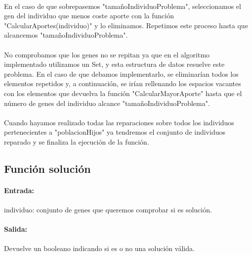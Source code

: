 	\paragraph{}En el caso de que sobrepasemos "tamañoIndividuoProblema", seleccionamos el gen del individuo que menos coste aporte con la función "CalcularAportes(individuo)" y lo eliminamos. Repetimos este proceso hasta que alcancemos "tamañoIndividuoProblema".
	
	\paragraph{}No comprobamos que los genes no se repitan ya que en el algoritmo implementado utilizamos un Set, y esta estructura de datos resuelve este problema. En el caso de que debamos implementarlo, se eliminarían todos los elementos repetidos y, a continuación, se irían rellenando los espacios vacantes con los elementos que devuelva la función "CalcularMayorAporte" hasta que el número de genes del individuo alcance "tamañoIndividuoProblema".
	
	\paragraph{}Cuando hayamos realizado todas las reparaciones sobre todos los individuos pertenecientes a "poblacionHijos" ya tendremos el conjunto de individuos reparado y se finaliza la ejecución de la función.
	
	\subsection{Función solución}
	
	\paragraph{Entrada:}
	
	\paragraph{}individuo: conjunto de genes que queremos comprobar si es solución.
	
	\paragraph{Salida:}
	
	\paragraph{}Devuelve un booleano indicando si es o no una solución válida.

